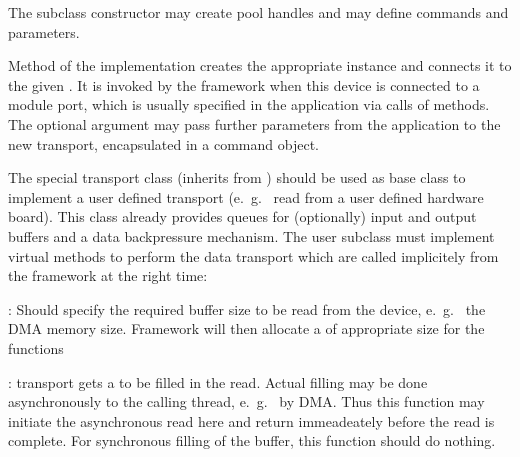 \begin{compactenum}
\item  The  subclass constructor may create  
      pool handles and may define commands and parameters. 

\item  Method  of the 
      implementation creates the appropriate  
      instance and connects it to the given .
      It is invoked by the framework  when this device is connected to 
      a module port, which is usually specified in the application via calls
      of  methods. The optional argument 
       may pass further parameters from the application 
      to the new transport, encapsulated in a command object. 
      

\item  The special transport class  
(inherits from )
       should be used as base class to implement a user defined transport 
      (e.~g.~ read from a user defined hardware board).
      This class already provides queues for (optionally)
      input and output buffers and a data backpressure mechanism. 
      The user subclass must implement virtual methods 
      to perform the data transport which are called implicitely from 
      the framework at the right time:
\begin{compactdesc}
	
	\item [\func{unsigned Read\_Size()}] : 
	Should specify the required buffer size to be read from the device, 
	e.~g.~ the DMA memory size. Framework will then allocate a 
	of appropriate size for the  functions

	\item [\func{unsigned Read\_Start(Buffer* buf)}] : transport gets a 
	 to be filled in the read. Actual filling may be done
	asynchronously to the calling thread, e.~g.~ by DMA. Thus
	this function may initiate the asynchronous read here and return
	immeadeately before the read is complete. 
	For synchronous filling of the buffer, this function should do nothing.
	

\end{compactdesc}
\end{compactenum}

